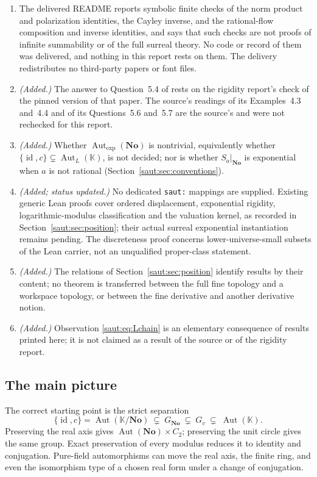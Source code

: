 \documentclass[11pt]{article}
\theoremstyle{definition}
\theoremstyle{remark}
\newcommand{\No}{\mathbf{No}}
\newcommand{\K}{\mathbb K}
\newcommand{\id}{\operatorname{id}}
\newcommand{\Aut}{\operatorname{Aut}}
\newcommand{\Gexp}{\operatorname{Aut}_{\exp}(\No)}
\newcommand{\AutL}{\operatorname{Aut}_{L}}
\numberwithin{equation}{section}
\begin{document}
\begin{enumerate}[label=\arabic*.,leftmargin=2.2em]
historically unresolved in every setting, nor is it claimed that the Hahn
literature lacks abstract descriptions (Section~\ref{saut:sec:questions}).
\item The delivered README reports symbolic finite checks of the norm
product and polarization identities, the Cayley inverse, and the
rational-flow composition and inverse identities, and says that such
checks are not proofs of infinite summability or of the full surreal
theory. No code or record of them was delivered, and nothing in this
report rests on them. The delivery redistributes no third-party papers or
font files.
\item \emph{(Added.)} The answer to Question~5.4 of \cite{KKS} rests on the
rigidity report's check of the pinned version of that paper. The source's
readings of its Examples~4.3 and~4.4 and of its Questions~5.6 and~5.7 are
the source's and were not rechecked for this report.
\item \emph{(Added.)} Whether $\Gexp$ is nontrivial, equivalently whether
$\{\id,c\}\subsetneq\AutL(\K)$, is not decided; nor is whether $S_a|_{\No}$
is exponential when $a$ is not rational (Section~\ref{saut:sec:conventions}).
\item \emph{(Added; status updated.)} No dedicated \texttt{saut:} mappings
are supplied. Existing generic Lean proofs cover ordered displacement,
exponential rigidity, logarithmic-modulus classification and the valuation
kernel, as recorded in
Section~\ref{saut:sec:position}; their actual surreal exponential
instantiation remains pending. The discreteness proof concerns
lower-universe-small subsets of the Lean carrier, not an unqualified
proper-class statement.
\item \emph{(Added.)} The relations of Section~\ref{saut:sec:position}
identify results by their content; no theorem is transferred between the
full fine topology and a workspace topology, or between the fine
derivative and another derivative notion.
\item \emph{(Added.)} Observation \eqref{saut:eq:Lchain} is an elementary
consequence of results printed here; it is not claimed as a result of the
source or of the rigidity report.
\end{enumerate}

\subsection{The main picture}

The correct starting point is the strict separation
\[
 \{\id,c\}=\Aut(\K/\No)
 \ \subsetneq\ G_{\No}
 \ \subsetneq\ G_v
 \ \subsetneq\ \Aut(\K).
\]
Preserving the real axis gives $\Aut(\No)\times C_2$; preserving the unit
circle gives the same group. Exact preservation of every modulus reduces
it to identity and conjugation. Pure-field automorphisms can move the
real axis, the finite ring, and even the isomorphism type of a chosen real
form under a change of conjugation.
\end{document}

